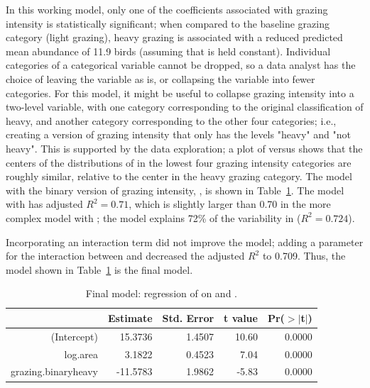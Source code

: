 In this working model, only one of the coefficients associated with grazing intensity is statistically significant; when compared to the baseline grazing category (light grazing), heavy grazing is associated with a reduced predicted mean abundance of 11.9 birds (assuming that  is held constant). Individual categories of a categorical variable cannot be dropped, so a data analyst has the choice of leaving the variable as is, or collapsing the variable into fewer categories. For this model, it might be useful to collapse grazing intensity into a two-level variable, with one category corresponding to the original classification of heavy, and another category corresponding to the other four categories; i.e., creating a version of grazing intensity that only has the levels "heavy" and "not heavy". This is supported by the data exploration; a plot of  versus  shows that the centers of the distributions of  in the lowest four grazing intensity categories are roughly similar, relative to the center in the heavy grazing category. The model with the binary version of grazing intensity, , is shown in Table~\ref{forestbirdsAbunLogAreaGrazingLevelRegress}. The model with  has adjusted $R^2 = 0.71$, which is slightly larger than 0.70 in the more complex model with ; the model explains 72\% of the variability in  ($R^2 = 0.724$). 

Incorporating an interaction term did not improve the model; adding a parameter for the interaction between  and  decreased the adjusted $R^2$ to 0.709. Thus, the model shown in Table~\ref{forestbirdsAbunLogAreaGrazingLevelRegress} is the final model.

\begin{table}[ht]
	\centering
	\begin{tabular}{rrrrr}
		\hline
		& Estimate & Std. Error & t value & Pr($>$$|$t$|$) \\ 
		\hline
		(Intercept) & 15.3736 & 1.4507 & 10.60 & 0.0000 \\ 
		log.area & 3.1822 & 0.4523 & 7.04 & 0.0000 \\ 
		grazing.binaryheavy & -11.5783 & 1.9862 & -5.83 & 0.0000 \\ 
		\hline
	\end{tabular}
	\caption{Final model: regression of  on  and .}
	\label{forestbirdsAbunLogAreaGrazingLevelRegress}
\end{table}


